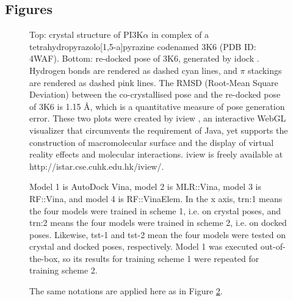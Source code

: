 \documentclass[twocolumn]{bmcart}
\begin{document}
\begin{backmatter}

\section*{Figures}

\begin{figure}[h]
\caption{ Top: crystal structure of PI3K$\alpha$ in complex of a tetrahydropyrazolo[1,5-a]pyrazine codenamed 3K6 (PDB ID: 4WAF). Bottom: re-docked pose of 3K6, generated by idock \cite{1362}. Hydrogen bonds are rendered as dashed cyan lines, and $\pi$ stackings are rendered as dashed pink lines. The RMSD (Root-Mean Square Deviation) between the co-crystallised pose and the re-docked pose of 3K6 is 1.15 \AA, which is a quantitative measure of pose generation error. These two plots were created by iview \cite{1366}, an interactive WebGL visualizer that circumvents the requirement of Java, yet supports the construction of macromolecular surface and the display of virtual reality effects and molecular interactions. iview is freely available at http://istar.cse.cuhk.edu.hk/iview/.
}
\label{fig:4WAF}
\end{figure}

\begin{figure}
\centering
\caption{ Model 1 is AutoDock Vina, model 2 is MLR::Vina, model 3 is RF::Vina, and model 4 is RF::VinaElem. In the x axis, trn:1 means the four models were trained in scheme 1, i.e. on crystal poses, and trn:2 means the four models were trained in scheme 2, i.e. on docked poses. Likewise, tst-1 and tst-2 mean the four models were tested on crystal and docked poses, respectively. Model 1 was executed out-of-the-box, so its results for training scheme 1 were repeated for training scheme 2.}
\label{rescoring2:set-1-pdbbind-2007-boxplot}
\end{figure}

\begin{figure}[h]
\caption{ The same notations are applied here as in Figure \ref{rescoring2:set-1-pdbbind-2007-boxplot}.}
\label{rescoring2:set-2-pdbbind-2012-boxplot}
\end{figure}


\end{backmatter}
\end{document}
